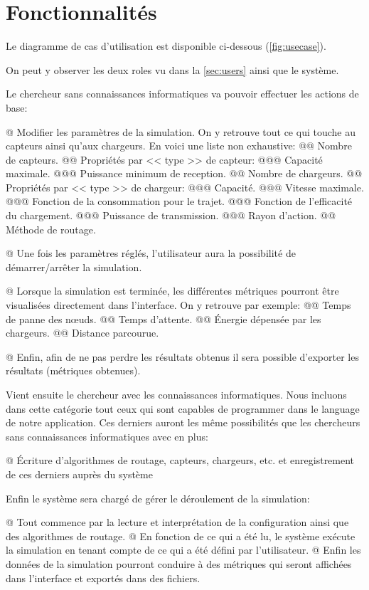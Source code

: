 \documentclass[noposter,final]{polytech/polytech}
\begin{document}
	
	\section{Fonctionnalités}
		Le diagramme de cas d'utilisation est disponible ci-dessous (\autoref{fig:usecase}).
		
		On peut y observer les deux roles vu dans la \autoref{sec:users} ainsi que le système.
		
		Le chercheur sans connaissances informatiques va pouvoir effectuer les actions de base:
		\begin{easylist}[itemize]
			@ Modifier les paramètres de la simulation.
			On y retrouve tout ce qui touche au capteurs ainsi qu'aux chargeurs.
			En voici une liste non exhaustive:
			@@ Nombre de capteurs.
			@@ Propriétés par << type >> de capteur:
			@@@ Capacité maximale.
			@@@ Puissance minimum de reception.
			@@ Nombre de chargeurs.
			@@ Propriétés par << type >> de chargeur:
			@@@ Capacité.
			@@@ Vitesse maximale.
			@@@ Fonction de la consommation pour le trajet.
			@@@ Fonction de l'efficacité du chargement.
			@@@ Puissance de transmission.
			@@@ Rayon d'action.
			@@ Méthode de routage.
			
			@ Une fois les paramètres réglés, l'utilisateur aura la possibilité de démarrer/arrêter la simulation.
			
			@ Lorsque la simulation est terminée, les différentes métriques pourront être visualisées directement dans l'interface.
			On y retrouve par exemple:
			@@ Temps de panne des n\oe uds.
			@@ Temps d'attente.
			@@ Énergie dépensée par les chargeurs.
			@@ Distance parcourue.
			
			@ Enfin, afin de ne pas perdre les résultats obtenus il sera possible d'exporter les résultats (métriques obtenues).
		\end{easylist}
		
		Vient ensuite le chercheur avec les connaissances informatiques.
		Nous incluons dans cette catégorie tout ceux qui sont capables de programmer dans le language de notre application.
		Ces derniers auront les même possibilités que les chercheurs sans connaissances informatiques avec en plus:
		\begin{easylist}[itemize]
			@ Écriture d'algorithmes de routage, capteurs, chargeurs, etc. et enregistrement de ces derniers auprès du système
		\end{easylist}
		
		Enfin le système sera chargé de gérer le déroulement de la simulation:
		\begin{easylist}[itemize]
			@ Tout commence par la lecture et interprétation de la configuration ainsi que des algorithmes de routage.
			@ En fonction de ce qui a été lu, le système exécute la simulation en tenant compte de ce qui a été défini par l'utilisateur.
			@ Enfin les données de la simulation pourront conduire à des métriques qui seront affichées dans l'interface et exportés dans des fichiers.
		\end{easylist}
\end{document}

